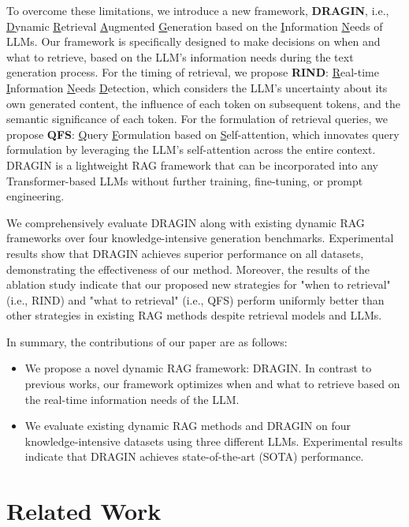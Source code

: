 To overcome these limitations, we introduce a new framework, \textbf{DRAGIN}, i.e., \underline{D}ynamic \underline{R}etrieval \underline{A}ugmented \underline{G}eneration based on the \underline{I}nformation \underline{N}eeds of LLMs. Our framework is specifically designed to make decisions on when and what to retrieve, based on the LLM's information needs during the text generation process.
For the timing of retrieval, we propose \textbf{RIND}: \underline{R}eal-time \underline{I}nformation \underline{N}eeds \underline{D}etection, which considers the LLM's uncertainty about its own generated content, the influence of each token on subsequent tokens, and the semantic significance of each token.
For the formulation of retrieval queries, we propose \textbf{QFS}: \underline{Q}uery \underline{F}ormulation based on \underline{S}elf-attention, which innovates query formulation by leveraging the LLM's self-attention across the entire context.
DRAGIN is a lightweight RAG framework that can be incorporated into any Transformer-based LLMs without further training, fine-tuning, or prompt engineering.

We comprehensively evaluate DRAGIN along with existing dynamic RAG frameworks over four knowledge-intensive generation benchmarks. Experimental results show that DRAGIN achieves superior performance on all datasets, demonstrating the effectiveness of our method. 
Moreover, the results of the ablation study indicate that our proposed new strategies for "when to retrieval" (i.e., RIND) and "what to retrieval" (i.e., QFS) perform uniformly better than other strategies in existing RAG methods despite retrieval models and LLMs. 

In summary, the contributions of our paper are as follows:

\begin{itemize}[leftmargin=*]
\item We propose a novel dynamic RAG framework: DRAGIN. In contrast to previous works, our framework optimizes when and what to retrieve based on the real-time information needs of the LLM.

\item We evaluate existing dynamic RAG methods and DRAGIN on four knowledge-intensive datasets using three different LLMs. Experimental results indicate that DRAGIN achieves state-of-the-art (SOTA) performance.

\end{itemize}

\section{Related Work}
